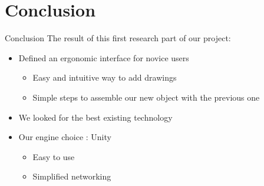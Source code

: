 \documentclass[a4paper,10pt]{beamer}
\begin{document}
		

	
	\section{Conclusion}
	
		\begin{frame}{Conclusion}
			The result of this first research part of our project:
			\hspace{4cm}
			\begin{itemize}
				\item Defined an ergonomic interface for novice users
					\begin{itemize}
						\item Easy and intuitive way to add drawings
						\item Simple steps to assemble our new object with the previous one
					\end{itemize}
					\hspace{3cm}
				\item We looked for the best existing technology
				\hspace{3cm}
				\item Our engine choice : Unity
					\begin{itemize}
						\item Easy to use
						\item Simplified networking
					\end{itemize}
				
			\end{itemize}
		\end{frame}
		
\end{document}
